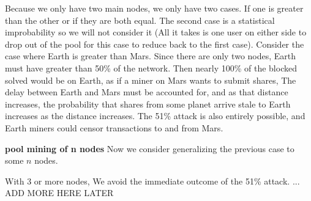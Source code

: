 \documentclass[conference]{IEEEtran}
\begin{document}
Because we only have two main nodes, we only have two cases. If one is greater than the other or if they are both equal. The second case is a statistical improbability so we will not consider it (All it takes is one user on either side to drop out of the pool for this case to reduce back to the first case). Consider the case where Earth is greater than Mars. Since there are only two nodes, Earth must have greater than 50\% of the network. Then nearly 100\% of the blocked solved would be on Earth, as if a miner on Mars wants to submit shares, The delay between Earth and Mars must be accounted for, and as that distance increases, the probability that shares from some planet arrive stale to Earth increases as the distance increases. The 51\% attack is also entirely possible, and Earth miners could censor transactions to and from Mars.

\textbf{pool mining of n nodes}
Now we consider generalizing the previous case to some $n$ nodes. 

With 3 or more nodes, We avoid the immediate outcome of the 51\% attack. ... ADD MORE HERE LATER
\end{document}
